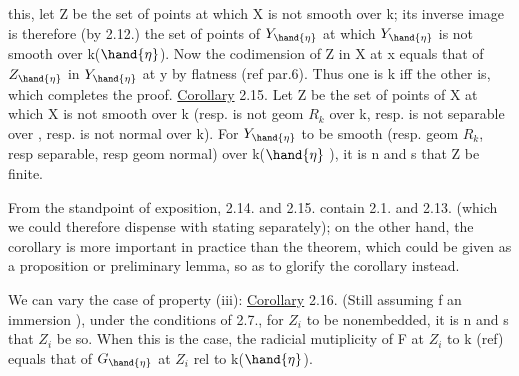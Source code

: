
this, let Z be the set of points at which X is not smooth over
k; its inverse image  is therefore (by 2.12.) the set of
points of $Y_{\hand{\eta}}$ at which $Y_{\hand{\eta}}$ is not smooth over k($\hand{\eta}$). Now the codimension
of Z in X at x equals that of $Z_{\hand{\eta}}$ in $Y_{\hand{\eta}}$ at y by
flatness (ref par.6). Thus one is \hand{$>$}k iff the other is,
which completes the proof.
\uline{Corollary} 2.15. Let Z be the set of points of X at which
X is not smooth over k (resp. is not geom $R_k$ over k, resp. is
 not separable over , resp. is not  normal over k). For $Y_{\hand{\eta}}$ to be
smooth (resp. geom $R_k$, resp separable, resp geom normal) over k($\hand{\eta}$ ), it
is n and s that Z be finite.

 From the standpoint of exposition, 2.14. and 2.15. contain 2.1. and
2.13. (which we could therefore dispense with stating separately); on the
other hand, the corollary is more important in practice than the theorem,
which could be given as a proposition or preliminary lemma, so as to
glorify the corollary instead.

We can vary  the case of property (iii):
\uline{Corollary} 2.16. (Still assuming f an immersion ), under the
 conditions of 2.7., for $Z_i$ to be nonembedded, it is n and s that $Z_i$ be so.
When this is the case, the radicial mutiplicity of F at $Z_i$  
to k (ref) equals that of $G_{\hand{\eta}}$ at $Z_i$ rel to k($\hand{\eta}$).

